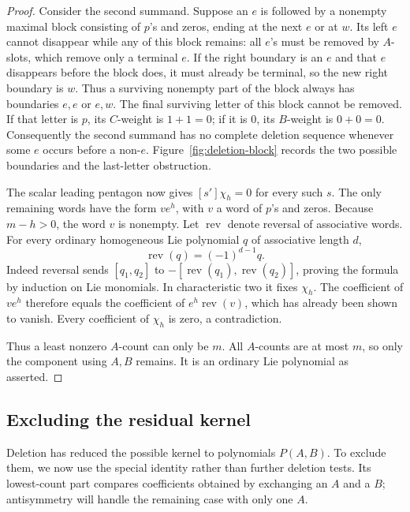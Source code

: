 \begin{proof}
Consider the second summand.  Suppose an $e$ is followed by a nonempty
maximal block consisting of $p$'s and zeros, ending at the next $e$ or
at $w$.  Its left $e$ cannot disappear while any of this block remains:
all $e$'s must be removed by $A$-slots, which remove only a terminal
$e$.  If the right boundary is an $e$ and that $e$ disappears before
the block does, it must already be terminal, so the new right boundary
is $w$.  Thus a surviving nonempty part of the block always has
boundaries $e,e$ or $e,w$.  The final surviving letter of this block
cannot be removed.  If that letter is $p$, its $C$-weight is $1+1=0$;
if it is $0$, its $B$-weight
is $0+0=0$.  Consequently the second summand has no complete deletion
sequence whenever some $e$ occurs before a non-$e$.
Figure~\ref{fig:deletion-block} records the two possible boundaries and
the last-letter obstruction.



The scalar leading pentagon now gives $[s']\chi_h=0$ for every such
$s$.  The only remaining words have the form $v e^h$, with $v$ a word
of $p$'s and zeros.  Because $m-h>0$, the word $v$ is nonempty.  Let
$\operatorname{rev}$ denote reversal of associative words.  For every
ordinary homogeneous Lie polynomial $q$ of associative length $d$,
\[
 \operatorname{rev}(q)=(-1)^{d-1}q.
\]
Indeed reversal sends $[q_1,q_2]$ to
$-[\operatorname{rev}(q_1),\operatorname{rev}(q_2)]$, proving the
formula by induction on Lie monomials.  In characteristic two it fixes
$\chi_h$.  The coefficient of $v e^h$ therefore equals the coefficient
of $e^h\operatorname{rev}(v)$, which has already been shown to vanish.
Every coefficient of $\chi_h$ is zero, a contradiction.

Thus a least nonzero $A$-count can only be $m$.  All $A$-counts are at
most $m$, so only the component using $A,B$ remains.  It is an ordinary
Lie polynomial as asserted.
\end{proof}

\subsection{Excluding the residual kernel}
Deletion has reduced the possible kernel to polynomials $P(A,B)$.
To exclude them, we now use the special identity rather than further
deletion tests.  Its lowest-count part compares coefficients obtained
by exchanging an $A$ and a $B$; antisymmetry will handle the remaining
case with only one $A$.

